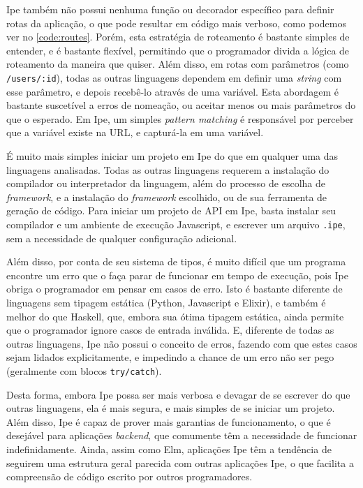 Ipe também não possui nenhuma função ou decorador específico para definir rotas da aplicação, o que
pode resultar em código mais verboso, como podemos ver no \autoref{code:routes}. Porém, esta
estratégia de roteamento é bastante simples de entender, e é bastante flexível, permitindo que o
programador divida a lógica de roteamento da maneira que quiser. Além disso, em rotas com parâmetros
(como \texttt{/users/:id}), todas as outras linguagens dependem em definir uma \textit{string} com esse
parâmetro, e depois recebê-lo através de uma variável. Esta abordagem é bastante suscetível a erros
de nomeação, ou aceitar menos ou mais parâmetros do que o esperado. Em Ipe, um simples \textit{pattern
    matching} é responsável por perceber que a variável existe na URL, e capturá-la em uma variável.

É muito mais simples iniciar um projeto em Ipe do que em qualquer uma das linguagens analisadas. Todas
as outras linguagens requerem a instalação do compilador ou interpretador da linguagem, além do processo
de escolha de \textit{framework}, e a instalação do \textit{framework} escolhido, ou de sua ferramenta
de geração de código. Para iniciar um projeto de API em Ipe, basta instalar seu compilador e um ambiente
de execução Javascript, e escrever um arquivo \texttt{.ipe}, sem a necessidade de qualquer configuração
adicional.

Além disso, por conta de seu sistema de tipos, é muito difícil que um programa encontre um erro que
o faça parar de funcionar em tempo de execução, pois Ipe obriga o programador em pensar em casos de
erro. Isto é bastante diferente de linguagens sem tipagem estática (Python, Javascript e Elixir), e
também é melhor do que Haskell, que, embora sua ótima tipagem estática, ainda permite que o programador
ignore casos de entrada inválida. E, diferente de todas as outras linguagens, Ipe não possui o conceito
de erros, fazendo com que estes casos sejam lidados explicitamente, e impedindo a chance de um erro
não ser pego (geralmente com blocos \texttt{try/catch}).

Desta forma, embora Ipe possa ser mais verbosa e devagar de se escrever do que outras linguagens,
ela é mais segura, e mais simples de se iniciar um projeto. Além disso, Ipe é capaz de prover mais
garantias de funcionamento, o que é desejável para aplicações \textit{backend}, que comumente têm a
necessidade de funcionar indefinidamente. Ainda, assim como Elm, aplicações Ipe têm a tendência de
seguirem uma estrutura geral parecida com outras aplicações Ipe, o que facilita a compreensão de
código escrito por outros programadores.
